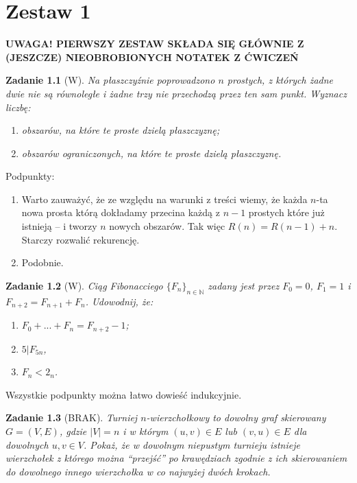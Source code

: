 \documentclass{mwbk}
\newtheorem{zad}{Zadanie}[chapter]
\begin{document}
\tableofcontents

\chapter{Zestaw 1}

\textbf{UWAGA! PIERWSZY ZESTAW SKŁADA SIĘ GŁÓWNIE Z (JESZCZE) NIEOBROBIONYCH NOTATEK Z ĆWICZEŃ}


\begin{zad}[W]
    Na płaszczyźnie poprowadzono $n$ prostych, z których żadne dwie nie
    są równoległe i żadne trzy nie przechodzą przez ten sam punkt.
    Wyznacz liczbę:
    \begin{enumerate}
        \item obszarów, na które te proste dzielą płaszczyznę;
        \item obszarów ograniczonych, na które te proste dzielą płaszczyznę.
    \end{enumerate}
\end{zad}
\begin{mdframed}
    Podpunkty:
    \begin{enumerate}
        \item Warto zauważyć, że ze względu na warunki z treści
              wiemy, że każda $n$-ta nowa prosta którą dokładamy przecina każdą z $n-1$
              prostych które już istnieją -- i tworzy $n$ nowych obszarów. Tak więc
              $R(n)= R(n-1) + n$. Starczy rozwalić rekurencję.
        \item Podobnie.
    \end{enumerate}
\end{mdframed}

\begin{zad}[W]
    Ciąg Fibonacciego $\{F_n\}_{n \in \mathbb{N}}$ zadany jest przez
    $F_0=0$, $F_1=1$ i $F_{n+2}=F_{n+1}+F_n$. Udowodnij, że: \\
    \begin{enumerate}
        \item $F_0 + ... + F_n = F_{n+2} - 1$;
        \item $5|F_{5n}$,
        \item $F_n < 2_n$.
    \end{enumerate}
\end{zad}
\begin{mdframed}
    Wszystkie podpunkty można łatwo dowieść indukcyjnie.
\end{mdframed}

\begin{zad}[BRAK]
    Turniej $n$-wierzchołkowy to dowolny graf skierowany $G = (V, E)$, gdzie $|V| = n$
    i w którym $(u, v) \in E$ lub $(v, u) \in E$ dla dowolnych $u, v \in V$.
    Pokaż, że w dowolnym niepustym turnieju istnieje wierzchołek z którego można “przejść”
    po krawędziach zgodnie z ich skierowaniem do dowolnego innego wierzchołka w co
    najwyżej dwóch krokach.
\end{zad}
\begin{mdframed}
\end{mdframed}
\end{document}
